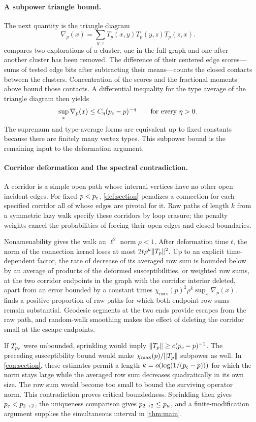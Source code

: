 \paragraph{A subpower triangle bound.}
The next quantity is the triangle diagram
\[
 \nabla_p(x)=\sum_{y,z}T_p(x,y)T_p(y,z)T_p(z,x).
\]
 compares two explorations of a cluster, one in the
full graph and one after another cluster has been removed. The
difference of their centered edge scores---sums of tested edge bits
after subtracting their means---counts the closed contacts between
the clusters. Concentration of the scores and the fractional
moments above bound those contacts. A differential inequality for the
type average of the triangle diagram then yields
\[
 \sup_x\nabla_p(x)\le C_\eta({p_c}-p)^{-\eta}
 \qquad\text{for every }\eta>0.
\]
The supremum and type-average forms are equivalent up to fixed constants
because there are finitely many vertex types. This subpower bound is the
remaining input to the deformation argument.

\paragraph{Corridor deformation and the spectral contradiction.}
A corridor is a simple open path whose internal vertices have no other
open incident edges. For fixed $p<{p_c}$, \cref{def:section} penalizes a
connection for each specified corridor all of whose edges are pivotal
for it. Raw paths of length $k$ from a symmetric lazy walk specify these
corridors by loop erasure; the penalty weights cancel the probabilities
of forcing their open edges and closed boundaries.

Nonamenability gives the walk an $\ell^2$ norm $\rho<1$. After deformation
time $t$, the norm of the connection kernel loses at most
$2t\rho^k\lVert T_p\rVert^2$. Up to an explicit time-dependent factor, the
rate of decrease of its averaged row sum is bounded below by an average
of products of the deformed susceptibilities, or weighted row sums, at the two
corridor endpoints in the graph with the corridor interior deleted,
apart from an error
bounded by a constant times
$\chi_{\max}(p)^2\rho^k\sup_x\nabla_p(x)$.
 finds a positive proportion of raw paths for which
both endpoint row sums remain substantial. Geodesic segments
at the two ends provide escapes from the raw path, and random-walk
smoothing makes the effect of deleting the corridor small at the
escape endpoints.

If $T_{p_c}$ were unbounded, sprinkling would imply
$\lVert T_p\rVert\ge c({p_c}-p)^{-1}$. The preceding susceptibility bound
would make $\chi_{\max}(p)/\lVert T_p\rVert$ subpower as well. In
\cref{con:section}, these estimates permit a length
$k=o(\log(1/({p_c}-p)))$ for which the norm stays large while the
averaged row sum decreases quadratically in its own size. The row sum
would become too small to bound the surviving operator norm. This
contradiction proves critical boundedness. Sprinkling then gives
${p_c}<{p_{2\to2}}$, the uniqueness comparison gives ${p_{2\to2}}\le{p_u}$, and a
finite-modification argument supplies the simultaneous interval in
\cref{thm:main}.

